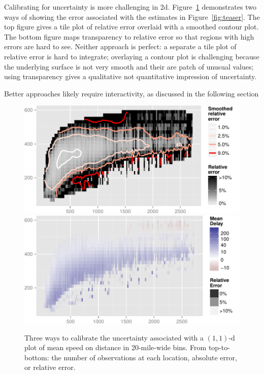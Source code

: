 \documentclass[journal]{vgtc}                %
\begin{document}
Calibrating for uncertainty is more challenging in 2d. Figure~\ref{fig:2d-error} demonstrates two ways of showing the error associated with the estimates in Figure~\ref{fig:teaser}. The top figure gives a tile plot of relative error overlaid with a smoothed contour plot. The bottom figure maps transparency to relative error so that regions with high errors are hard to see. Neither approach is perfect: a separate a tile plot of relative error is hard to integrate; overlaying a contour plot is challenging because the underlying surface is not very smooth and their are patch of unusual values; using transparency gives a qualitative not quantitative impression of uncertainty.

Better approaches likely require interactivity, as discussed in the following section

\begin{figure}
  \centering
   \includegraphics[width=\linewidth]{2d-error}
   \includegraphics[width=\linewidth]{2d-alpha}
 \caption{Three ways to calibrate the uncertainty associated with a $(1,1)$-d plot of mean speed on distance in 20-mile-wide bins. From top-to-bottom: the number of observations at each location, absolute error, or relative error.}
 \label{fig:2d-error}
\end{figure}
\end{document}
